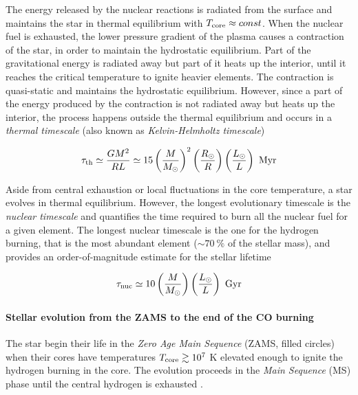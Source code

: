 \documentclass[a4paper,titlepage]{book}     	%
\newcommand{\sun}{\ensuremath{_\odot}}
\begin{document}
The energy released by the nuclear reactions is radiated from the surface and maintains the star in thermal equilibrium with $T_{\rm core} \approx const$. When the nuclear fuel is exhausted, the lower pressure gradient of the plasma causes a contraction of the star, in order to maintain the hydrostatic equilibrium. Part of the gravitational energy is radiated away but part of it heats up the interior, until it reaches the critical temperature to ignite heavier elements. The contraction is quasi-static and maintains the hydrostatic equilibrium. However, since a part of the energy produced by the contraction is not radiated away but heats up the interior, the process happens outside the thermal equilibrium and occurs in a \emph{thermal timescale} (also known as \emph{Kelvin-Helmholtz timescale})

\begin{equation}\label{eq:tauth}
\tau_\textup{th} \simeq \frac{G M^2}{R L} \simeq 15 
\left(\frac{M}{M\sun}\right)^{2} \left(\frac{R\sun}{R}\right) \left(\frac{L\sun}{L}\right)\ \text{Myr}
\end{equation}

Aside from central exhaustion or local fluctuations in the core temperature, a star evolves in thermal equilibrium. However, the longest evolutionary timescale is the \emph{nuclear timescale} and quantifies the time required to burn all the nuclear fuel for a given element. The longest nuclear timescale is the one for the hydrogen burning, that is the most abundant element ($\sim 70~\%$ of the stellar mass), and provides an order-of-magnitude estimate for the stellar lifetime

\begin{equation}\label{eq:taunuc}
\tau_\textup{nuc} \simeq 10 \left(\frac{M}{M\sun}\right) \left(\frac{L\sun}{L}\right)\ \text{Gyr}
\end{equation}

\paragraph{Stellar evolution from the ZAMS to the end of the CO burning} The star begin their life in the \emph{Zero Age Main Sequence} (ZAMS, filled circles) when their cores have temperatures $T_{\rm core} \gtrsim 10^{7}$ K elevated enough to ignite the hydrogen burning in the core. The evolution proceeds in the \emph{Main Sequence} (MS) phase until the central hydrogen is exhausted \cite{evostellare}. 
\end{document}
